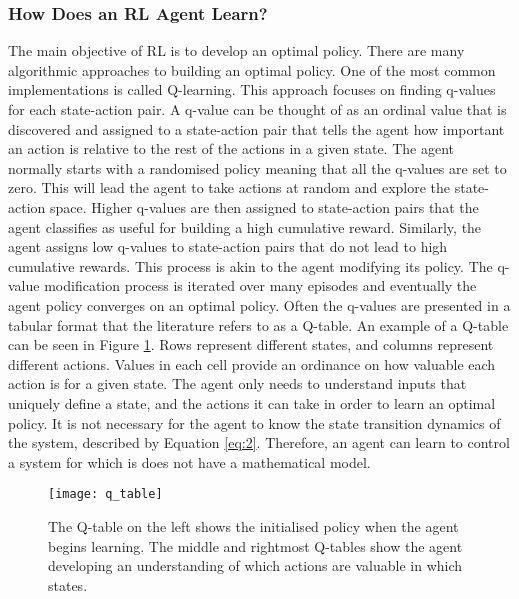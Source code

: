 \subsubsection{How Does an RL Agent Learn?}\label{rl}
The main objective of RL is to develop an optimal policy. There are many algorithmic approaches to building an optimal policy. One of the most common implementations is called Q-learning. This approach focuses on finding q-values for each state-action pair. A q-value can be thought of as an ordinal value that is discovered and assigned to a state-action pair that tells the agent how important an action is relative to the rest of the actions in a given state. The agent normally starts with a randomised policy meaning that all the q-values are set to zero. This will lead the agent to take actions at random and explore the state-action space. Higher q-values are then assigned to state-action pairs that the agent classifies as useful for building a high cumulative reward. Similarly, the agent assigns low q-values to state-action pairs that do not lead to high cumulative rewards. This process is akin to the agent modifying its policy. The q-value modification process is iterated over many episodes and eventually the agent policy converges on an optimal policy. Often the q-values are presented in a tabular format that the literature refers to as a Q-table. An example of a Q-table can be seen in Figure \ref{fig:qtable}. Rows represent different states, and columns represent different actions. Values in each cell provide an ordinance on how valuable each action is for a given state. The agent only needs to understand inputs that uniquely define a state, and the actions it can take in order to learn an optimal policy. It is not necessary for the agent to know the state transition dynamics of the system, described by Equation \ref{eq:2}. Therefore, an agent can learn to control a system for which is does not have a mathematical model.
\begin{figure}[ht]
	\centering
	\texttt{[image: q\_table]}
	\caption{The Q-table on the left shows the initialised policy when the agent begins learning. The middle and rightmost Q-tables show the agent developing an understanding of which actions are valuable in which states.}
	\label{fig:qtable}
\end{figure}

